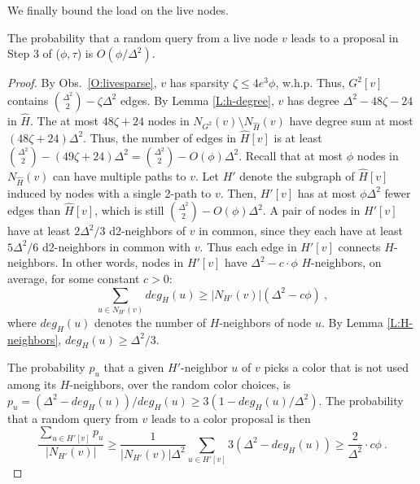 We finally bound the load on the live nodes.

\begin{lemma}
The probability that a random query from a live node $v$ leads to a proposal in Step 3 of ($\phi,\tau$) is $O(\phi/\Delta^2)$.
\label{L:color-proposal}
\end{lemma}

\begin{proof}
By Obs.~\ref{O:livesparse}, $v$ has sparsity $\zeta \le 4e^3 \phi$, w.h.p. Thus, $G^2[v]$ contains $\binom{\Delta^2}{2} - \zeta \Delta^2$ edges. 
By Lemma \ref{L:h-degree}, $v$ has degree $\Delta^2 - 48\zeta - 24$ in $\hat{H}$. The at most 
$48\zeta+24$ nodes in $N_{G^2}(v) \setminus N_{\hat{H}}(v)$ have degree sum at most $(48\zeta+24) \Delta^2$. Thus, the number of edges in $\hat{H}[v]$ is at least  
$\binom{\Delta^2}{2} - (49\zeta +24)\Delta^2 = \binom{\Delta^2}{2} - O(\phi)\Delta^2$.
Recall that at most $\phi$ nodes in $N_{\hat{H}}(v)$ can have multiple paths to $v$. Let $H'$ denote the subgraph of $\hat{H}[v]$ induced by nodes with a single 2-path to $v$.
Then, $H'[v]$ has at most $\phi \Delta^2$ fewer edges than $\hat{H}[v]$, which is still $\binom{\Delta^2}{2} - O(\phi)\Delta^2$. A pair of nodes in $H'[v]$ have at least $2\Delta^2/3$ d2-neighbors of $v$ in common, since they each have at least $5\Delta^2/6$ d2-neighbors in common with $v$. Thus each edge in $H'[v]$ connects $H$-neighbors. In other words, nodes in $H'[v]$ have $\Delta^2 - c \cdot \phi$ $H$-neighbors, on average, for some constant $c > 0$: 
\[ \sum_{u \in N_{H'}(v)} deg_H(u) \ge |N_{H'}(v)| (\Delta^2 - c\phi)\ , \]
where $deg_{H}(u)$ denotes the number of $H$-neighbors of node $u$. By Lemma \ref{L:H-neighbors}, $deg_H(u) \ge \Delta^2/3$.

The probability $p_u$ that a given $H'$-neighbor $u$ of $v$ picks a color that is not used among its $H$-neighbors, over the random color choices, is $p_u = (\Delta^2 - deg_{H}(u))/deg_{H}(u) \ge 3(1 - deg_H(u)/\Delta^2)$. The probability that a random query from $v$ leads to a color proposal is then 
  \[ \frac{\sum_{u \in H'[v]} p_u}{|N_{H'}(v)|} \ge \frac{1}{|N_{H'}(v)|\Delta^2} \sum_{u \in H'[v]} 3 \left(\Delta^2 - deg_H(u)\right) \ge  \frac{2}{\Delta^2} \cdot c \phi \ . \]  
\end{proof}

